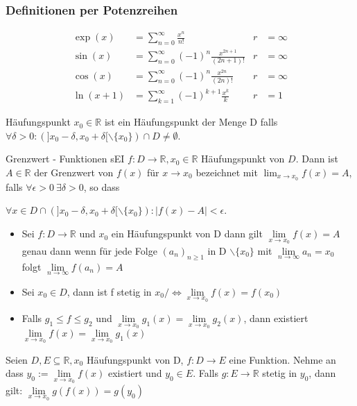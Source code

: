 \documentclass[a4paper,10pt]{article}
\def\limn{\lim\limits_{n\to \infty}}
\def\sumk{\sum\limits_{k=1}^{\infty}}
\def\sumn{\sum\limits_{n=0}^{\infty}}
\def\R{\mathbb{R}}
\begin{document}
\subsubsection{Definitionen per Potenzreihen}

\begin{align*}
\exp(x) &= \sumn \frac{x^n}{n!} & r &= \infty \\
\sin(x) &= \sumn (-1)^n \frac{x^{2n + 1}}{(2n + 1)!} & r &= \infty \\
\cos(x) &= \sumn (-1)^n \frac{x^{2n}}{(2n)!} & r &= \infty \\
\ln(x + 1) &= \sumk (-1)^{k+1} \frac{x^k}{k} & r &= 1
\end{align*}

\begin{subbox}{Häufungspunkt}
 $x_0 \in \R$ ist ein Häufungspunkt der Menge D falls $\forall \delta > 0: (]x_0 - \delta, x_0 + \delta[ \backslash \{x_0\}) \cap D \ne \emptyset $.
\end{subbox}

\begin{mainbox}{Grenzwert - Funktionen}
 sEI $f: D \to \R, x_0 \in \R$ Häufungspunkt von $D$. Dann ist $A \in \R$ der Grenzwert von $f(x)$ für $x \to x_0$ bezeichnet mit $\lim_{x\to x_0} f(x) = A$, falls $\forall \epsilon > 0 \ \exists \delta > 0$, so dass \par
 $\forall x \in D \cap (]x_0 - \delta, x_0 + \delta[ \backslash \{x_0\}): |f(x) - A| < \epsilon$.
\end{mainbox}

\begin{itemize}
  \item Sei $f : D \to \R$ und $x_0$ ein Häufungspunkt von D dann gilt $\lim\limits_{x\to x_0} f(x) = A$ genau dann wenn für jede Folge $(a_n)_{n\geq 1}$ in D $\backslash \{x_0\}$ mit $\limn a_n = x_0$ folgt $\limn f(a_n) = A$
  \item Sei $x_0 \in D$, dann ist f stetig in $x_0 /\Leftrightarrow \lim\limits_{x\to x_0} f(x) = f(x_0)$
  \item Falls $g_1 \leq f \leq g_2$ und $\lim\limits_{x\to x_0} g_1(x) = \lim\limits_{x\to x_0} g_2(x)$, dann existiert $\lim\limits_{x\to x_0} f(x) = \lim\limits_{x\to x_0} g_1(x)$
\end{itemize}

Seien $D,E\subseteq \R, x_0$ Häufungspunkt von D, $f:D\to E$ eine Funktion. Nehme an dass $y_0 := \lim\limits_{x\to x_0}f(x)$ existiert und $y_0 \in E$. Falls $g:E\to\R$ stetig in $y_0$, dann gilt: $\lim\limits_{x\to x_0}g(f(x)) = g(y_0)$
\end{document}
